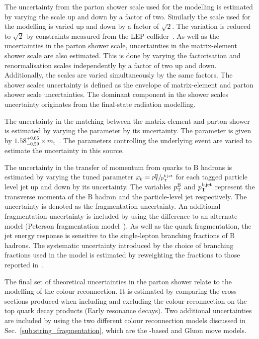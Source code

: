 The uncertainty from the parton shower scale used for the \ISR{} modelling is estimated by varying the scale up and down by a factor of two.
Similarly the scale used for the \FSR{} modelling is varied up and down by a factor of $\sqrt{2}$.
The variation is reduced to $\sqrt{2}$ by constraints measured from the LEP collider~\cite{Sys:FSR}.
As well as the uncertainties in the parton shower scale, uncertainties in the matrix-element shower scale are also estimated.
This is done by varying the factorisation and renormalisation scales independently by a factor of two up and down. 
Additionally, the scales are varied simultaneously by the same factors.
The shower scales uncertainty is defined as the envelope of matrix-element and parton shower scale uncertainties.
The dominant component in the shower scales uncertainty originates from the final-state radiation modelling.

The uncertainty in the matching between the matrix-element and parton shower is estimated by varying the \hdamp{} parameter by its uncertainty.
The \hdamp{} parameter is given by $1.58^{+0.66}_{-0.59}\times m_{\mathrm{t}}$~\cite{Gen:CUETP8M2T4}.
The parameters controlling the underlying event are varied to estimate the uncertainty in this source.

The uncertainty in the transfer of momentum from \bquark{} quarks to $\mathrm{B}$ hadrons is estimated by varying the tuned parameter $x_{b} = \sfrac{p_{\mathrm{T}}^{\mathrm{B}}}{p_{\mathrm{T}}^{\mathrm{b\,jet}}}$ for each tagged particle level \bquark{} jet up and down by its uncertainty.
The variables $p_{\mathrm{T}}^{\mathrm{B}}$ and $p_{\mathrm{T}}^{\mathrm{b\,jet}}$ represent the transverse momenta of the $\mathrm{B}$ hadron and the particle-level \bquark{} jet respectively.
The uncertainty is denoted as the fragmentation uncertainty.
An additional fragmentation uncertainty is included by using the difference to an alternate model (Peterson fragmentation model~\cite{Sys:PFrag}).
As well as the \bquark{} quark fragmentation, the \bquark{} jet energy response is sensitive to the single-lepton branching fractions of $\mathrm{B}$ hadrons.
The systematic uncertainty introduced by the choice of branching fractions used in the \powhegpythia{} model is estimated by reweighting the fractions to those reported in~\cite{PDG}.

The final set of theoretical uncertainties in the parton shower relate to the modelling of the colour reconnection.
It is estimated by comparing the cross sections produced when including and excluding the colour reconnection on the top quark decay products (Early resonance decays).
Two additional uncertainties are included by using the two different colour reconnection models discussed in Sec.~\ref{sub:string_fragmentation}, which are the \QCD{}-based and Gluon move models.

